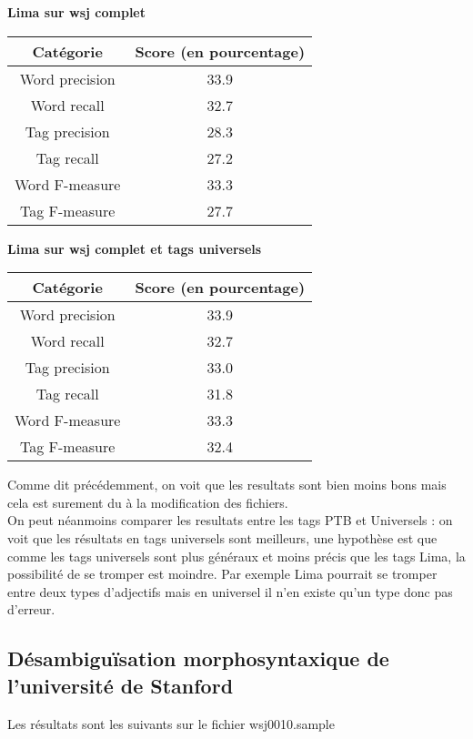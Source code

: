 \documentclass[12pt]{report}
\begin{document}
\textbf{Lima sur wsj complet}

\begin{tabular}{c c}
\hline
  Catégorie & Score (en pourcentage) \\
\hline
    Word precision & 33.9 \\
    Word recall & 32.7 \\
    Tag precision & 28.3 \\
    Tag recall & 27.2 \\
    Word F-measure & 33.3 \\
    Tag F-measure & 27.7 \\
    
\end{tabular}

\vspace{15mm}
\textbf{Lima sur wsj complet et tags universels}

\begin{tabular}{c c}
\hline
  Catégorie & Score (en pourcentage) \\
\hline
    Word precision & 33.9 \\
    Word recall & 32.7 \\
    Tag precision & 33.0 \\
    Tag recall & 31.8 \\
    Word F-measure & 33.3 \\
    Tag F-measure & 32.4 \\
    
\end{tabular}

Comme dit précédemment, on voit que les resultats sont bien moins bons mais cela est surement du à la modification des fichiers.\\
On peut néanmoins comparer les resultats entre les tags PTB et Universels : on voit que les résultats en tags universels sont meilleurs, une hypothèse est que comme les tags universels sont plus généraux et moins précis que les tags Lima, la possibilité de se tromper est moindre. Par exemple Lima pourrait se tromper entre deux types d'adjectifs mais en universel il n'en existe qu'un type donc pas d'erreur.

\subsection{Désambiguïsation morphosyntaxique de l’université de Stanford}

Les résultats sont les suivants sur le fichier wsj0010.sample
\end{document}
